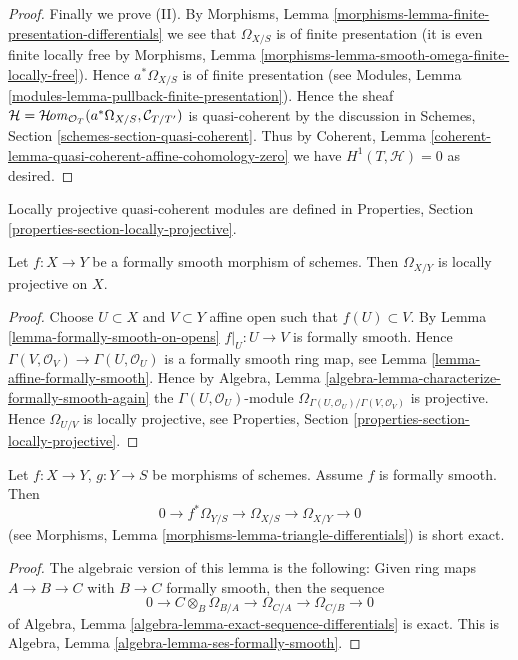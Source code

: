 \begin{proof}
\medskip\noindent
Finally we prove (II).
By Morphisms, Lemma \ref{morphisms-lemma-finite-presentation-differentials}
we see that $\Omega_{X/S}$ is of finite presentation
(it is even finite locally free by
Morphisms, Lemma \ref{morphisms-lemma-smooth-omega-finite-locally-free}).
Hence $a^*\Omega_{X/S}$ is of finite presentation (see
Modules, Lemma \ref{modules-lemma-pullback-finite-presentation}).
Hence the sheaf
$\mathcal{H} =
\mathop{\mathcal{H}\!{\it om}}\nolimits_{\mathcal{O}_T}(a^*\Omega_{X/S}, \mathcal{C}_{T/T'})$
is quasi-coherent by the discussion in
Schemes, Section \ref{schemes-section-quasi-coherent}.
Thus by
Coherent, Lemma \ref{coherent-lemma-quasi-coherent-affine-cohomology-zero}
we have $H^1(T, \mathcal{H}) = 0$ as desired.
\end{proof}

\noindent
Locally projective quasi-coherent modules are defined in
Properties, Section \ref{properties-section-locally-projective}.

\begin{lemma}
\label{lemma-formally-smooth-sheaf-differentials}
Let $f : X \to Y$ be a formally smooth morphism of schemes.
Then $\Omega_{X/Y}$ is locally projective on $X$.
\end{lemma}

\begin{proof}
Choose $U \subset X$ and $V \subset Y$ affine open such that
$f(U) \subset V$. By
Lemma \ref{lemma-formally-smooth-on-opens}
$f|_U : U \to V$ is formally smooth. Hence
$\Gamma(V, \mathcal{O}_V) \to \Gamma(U, \mathcal{O}_U)$ is
a formally smooth ring map, see
Lemma \ref{lemma-affine-formally-smooth}.
Hence by
Algebra, Lemma \ref{algebra-lemma-characterize-formally-smooth-again}
the $\Gamma(U, \mathcal{O}_U)$-module
$\Omega_{\Gamma(U, \mathcal{O}_U)/\Gamma(V, \mathcal{O}_V)}$
is projective. Hence $\Omega_{U/V}$ is locally projective, see
Properties, Section \ref{properties-section-locally-projective}.
\end{proof}

\begin{lemma}
\label{lemma-triangle-differentials-formally-smooth}
Let $f : X \to Y$, $g : Y \to S$ be morphisms of schemes.
Assume $f$ is formally smooth. Then
$$
0 \to f^*\Omega_{Y/S} \to \Omega_{X/S} \to \Omega_{X/Y} \to 0
$$
(see
Morphisms, Lemma \ref{morphisms-lemma-triangle-differentials})
is short exact.
\end{lemma}

\begin{proof}
The algebraic version of this lemma is the following:
Given ring maps $A \to B \to C$ with $B \to C$ formally smooth, then
the sequence
$$
0 \to C \otimes_B \Omega_{B/A} \to \Omega_{C/A} \to \Omega_{C/B} \to 0
$$
of
Algebra, Lemma \ref{algebra-lemma-exact-sequence-differentials}
is exact. This is
Algebra, Lemma \ref{algebra-lemma-ses-formally-smooth}.
\end{proof}

